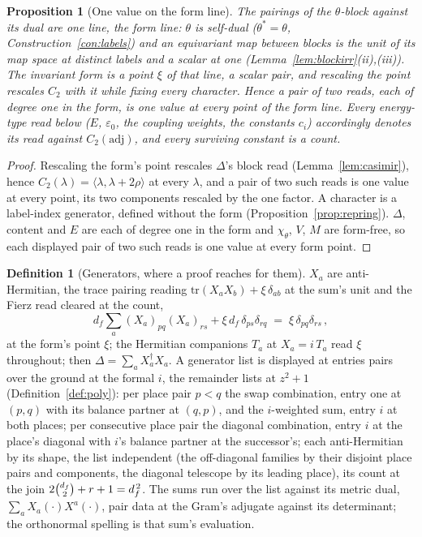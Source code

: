\documentclass[11pt]{article}
\newtheorem{proposition}{Proposition}
\theoremstyle{definition}
\newtheorem{definition}{Definition}
\begin{document}
\begin{proposition}[One value on the form line]\label{prop:form}
The pairings of the $\theta$-block against its dual are one line, the
\emph{form line}: $\theta$ is self-dual ($\theta^*=\theta$,
Construction~\ref{con:labels}) and an equivariant map between blocks is
the unit of its map space at distinct labels and a scalar at one
(Lemma~\ref{lem:blockirr}(ii),(iii)). The \emph{invariant form} is a
point $\xi$ of that line, a scalar pair, and rescaling the point rescales $C_2$
with it while
fixing every character. Hence a pair of two reads, each of degree one in the
form, is one value at every point of the form line. Every energy-type read below ($E$, $\varepsilon_0$,
the coupling weights, the constants $c_i$) accordingly denotes its
read against $C_2(\mathrm{adj})$, and every surviving constant is a count.
\end{proposition}
\begin{proof}
Rescaling the form's point rescales $\Delta$'s block read
(Lemma~\ref{lem:casimir}), hence
$C_2(\lambda)=\langle\lambda,\lambda+2\rho\rangle$ at every $\lambda$,
and a pair of two such reads is one value at every point, its two
components rescaled by the one factor. A character is a label-index generator,
defined without the form (Proposition~\ref{prop:repring}). $\Delta$, $\mathrm{content}$ and $E$ are each of degree
one in the form and $\chi_\theta$, $V$, $M$ are form-free, so each displayed
pair of two such reads is one value at every form point.
\end{proof}

\begin{definition}[Generators, where a proof reaches for them]\label{def:generators}
$X_a$ are anti-Hermitian, the trace pairing reading
$\mathrm{tr}(X_aX_b)+\xi\,\delta_{ab}$ at the sum's unit and the
Fierz read cleared at the count,
\[
d_f\sum_a(X_a)_{pq}(X_a)_{rs}+\xi\,d_f\,\delta_{ps}\delta_{rq}
\;=\;\xi\,\delta_{pq}\delta_{rs}\,,
\]
at the form's
point $\xi$; the Hermitian companions $T_a$ at $X_a=i\,T_a$ read
$\xi$ throughout; then
$\Delta=\sum_aX_a^{\dagger}X_a$. A generator list is displayed at entries pairs over the
ground at the formal $i$, the remainder lists at $z^2+1$
(Definition~\ref{def:poly}): per place pair $p<q$ the swap
combination, entry one at $(p,q)$ with its balance partner at
$(q,p)$, and the $i$-weighted sum, entry $i$ at both places; per
consecutive place pair the diagonal combination, entry $i$ at the
place's diagonal with $i$'s balance partner at the successor's; each
anti-Hermitian by its shape, the list independent (the
off-diagonal families by their disjoint place pairs and
components, the diagonal telescope by its leading place), its
count at the join $2\tbinom{d_f}2+r+1=d_f^{\,2}$. The sums run
over the list against its
metric dual, $\sum_aX_a(\cdot)X^a(\cdot)$, pair data at the Gram's
adjugate against its determinant;
the orthonormal spelling is that sum's evaluation.

\end{definition}
\end{document}

